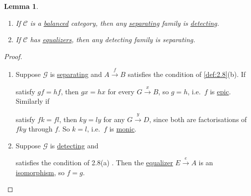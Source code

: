 \documentclass{article}
\let\to\longrightarrow
\newtheorem{nlemma}[nthm]{Lemma}
\begin{document}
\begin{nlemma}\label{lem:2.9}\leavevmode
  \begin{enumerate}[label=(\roman*)]
    \item If $\mathscr{C}$ is a \hyperlink{def:balanced}{balanced} category, then any \hyperlink{def:separating}{separating} family is \hyperlink{def:detecting}{detecting}.
    \item If $\mathscr{C}$ has \hyperlink{def:equalizer}{equalizers}, then any detecting family is separating.
  \end{enumerate}
\end{nlemma}
\begin{proof}\leavevmode
  \begin{enumerate}[label=(\roman*)]
    \item Suppose $\mathscr{G}$ is \hyperlink{def:separating}{separating} and $A \overset{f}\to B$ satisfies the condition of \cref{def:2.8}(b).
      If  satisfy $gf = hf$, then $gx = hx$ for every $G \overset{x}\to B$, so $g = h$, i.e.\ $f$ is \hyperlink{def:epic}{epic}.
      Similarly if
      satisfy $fk = fl$, then $ky = ly$ for any $G \overset{y}\to D$, since both are factorisations of $fky$ through $f$. So $k=l$, i.e.\ $f$ is \hyperlink{def:monic}{monic}.
    \item Suppose $\mathscr{G}$ is \hyperlink{def:detecting}{detecting} and  satisfies the condition of 2.8(a) .
      Then the \hyperlink{def:equalizer}{equalizer} $E \overset{e}\to A$ is an \hyperlink{def:iso}{isomorphism}, so $f = g$.
  \end{enumerate}
\end{proof}
\end{document}
